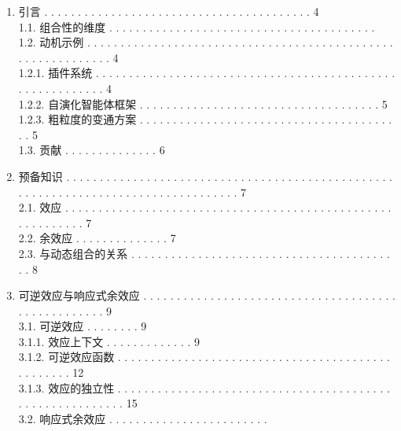 \begin{enumerate}
\def\labelenumi{\arabic{enumi}.}
\tightlist
\item
  引言 . . . . . . . . . . . . . . . . . . . . . . . . . . . . .
  . . . . . . . . . . . 4\\
  1.1. 组合性的维度 . . . . . . . . . . . . . . . . . . .
  . . . . . . . . . . . . . . . . . . . . .\\
  1.2. 动机示例 . . . . . . . . . . . . . . . . . . . . . . .
  . . . . . . . . . . . . . . . . . . . . . . . . . . . . . . . . . . .
  . . 4\\
  1.2.1. 插件系统 . . . . . . . . . . . . . . . . . . . . . . . .
  . . . . . . . . . . . . . . . . . . . . . . . . . . . . . . . . . .
  4\\
  1.2.2. 自演化智能体框架 . . . . . . . . . . . . . . . . .
  . . . . . . . . . . . . . . . . . . . 5\\
  1.2.3. 粗粒度的变通方案 . . . . . . . . . . . . . . . . .
  . . . . . . . . . . . . . . . . . . . . . . . 5\\
  1.3. 贡献 . . . . . . . . . . . . . . 6\\
\item
  预备知识 . . . . . . . . . . . . . . . . . . . . . . . . . . . .
  . . . . . . . . . . . . . . . . . . . . . . . . . . . . . . . . . . .
  . . . . . . . . . . . . . . . . . . . 7\\
  2.1. 效应 . . . . . . . . . . . . . . . . . . . . . . . . . . . . .
  . . . . . . . . . . . . . . . . . . . . . . . . . . . . . . 7\\
  2.2. 余效应 . . . . . . . . . . . . . . 7\\
  2.3. 与动态组合的关系 . . . . . . . . . . . . . .
  . . . . . . . . . . . . . . . . . . . . . . . . . . . 8\\
\item
  可逆效应与响应式余效应 . . . . . . . . . . . . . . .
  . . . . . . . . . . . . . . . . . . . . . . . . . . . . . . . . . . .
  . 9\\
  3.1. 可逆效应 . . . . . . . . 9\\
  3.1.1. 效应上下文 . . . . . . . . . . . . . 9\\
  3.1.2. 可逆效应函数 . . . . . . . . . . . . . . . . . .
  . . . . . . . . . . . . . . . . . . . . . . . . . . . . . . . 12\\
  3.1.3. 效应的独立性 . . . . . . . . . . . . . . . . . . . .
  . . . . . . . . . . . . . . . . . . . . . . . . . . . . . . . . . . .
  . . 15\\
  3.2. 响应式余效应 . . . . . . . . . . . . . . . . . . . . . . . .

\end{enumerate}
